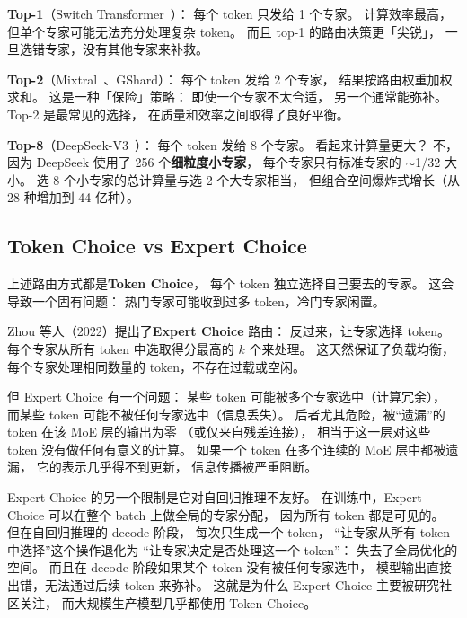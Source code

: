 \textbf{Top-1}（Switch Transformer~\cite{fedus2022switch}）：
每个 token 只发给 1 个专家。
计算效率最高，但单个专家可能无法充分处理复杂 token。
而且 top-1 的路由决策更「尖锐」，
一旦选错专家，没有其他专家来补救。

\textbf{Top-2}（Mixtral~\cite{jiang2024mixtral}、GShard）：
每个 token 发给 2 个专家，%
结果按路由权重加权求和。
这是一种「保险」策略：
即使一个专家不太合适，
另一个通常能弥补。
Top-2 是最常见的选择，
在质量和效率之间取得了良好平衡。

\textbf{Top-8}（DeepSeek-V3~\cite{deepseekv3}）：
每个 token 发给 8 个专家。
看起来计算量更大？
不，因为 DeepSeek 使用了 256 个\textbf{细粒度小专家}，
每个专家只有标准专家的 $\sim$1/32 大小。
选 8 个小专家的总计算量与选 2 个大专家相当，
但组合空间爆炸式增长（从 28 种增加到 44 亿种）。

\subsection{Token Choice vs Expert Choice}

上述路由方式都是\textbf{Token Choice}，
每个 token 独立选择自己要去的专家。
这会导致一个固有问题：
热门专家可能收到过多 token，冷门专家闲置。

Zhou 等人（2022）提出了\textbf{Expert Choice} 路由：%
反过来，让专家选择 token。
每个专家从所有 token 中选取得分最高的 $k$ 个来处理。
这天然保证了负载均衡，
每个专家处理相同数量的 token，不存在过载或空闲。

但 Expert Choice 有一个问题：
某些 token 可能被多个专家选中（计算冗余），
而某些 token 可能不被任何专家选中（信息丢失）。
后者尤其危险，被“遗漏”的 token 在该 MoE 层的输出为零
（或仅来自残差连接），
相当于这一层对这些 token 没有做任何有意义的计算。
如果一个 token 在多个连续的 MoE 层中都被遗漏，
它的表示几乎得不到更新，
信息传播被严重阻断。

Expert Choice 的另一个限制是它对自回归推理不友好。
在训练中，Expert Choice 可以在整个 batch 上做全局的专家分配，
因为所有 token 都是可见的。
但在自回归推理的 decode 阶段，
每次只生成一个 token，
“让专家从所有 token 中选择”这个操作退化为
“让专家决定是否处理这一个 token”：
失去了全局优化的空间。
而且在 decode 阶段如果某个 token 没有被任何专家选中，
模型输出直接出错，无法通过后续 token 来弥补。
这就是为什么 Expert Choice 主要被研究社区关注，
而大规模生产模型几乎都使用 Token Choice。

